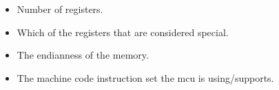 \begin{itemize}
  \item Number of registers.
  \item Which of the registers that are considered special.
  \item The endianness of the memory.
  \item The machine code instruction set the \gls{mcu} is using/supports.
\end{itemize}










